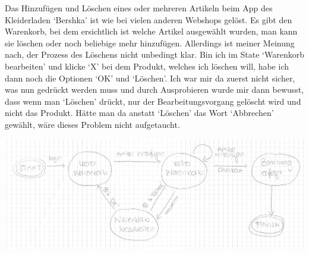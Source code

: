 Das Hinzufügen und Löschen eines oder mehreren Artikeln beim App des Kleiderladen ‘Bershka’ ist wie bei vielen anderen Webshops gelöst. 
Es gibt den Warenkorb, bei dem ersichtlich ist welche Artikel ausgewählt wurden, man kann sie löschen oder noch beliebige mehr hinzufügen. 
Allerdings ist meiner Meinung nach, der Prozess des Löschens nicht unbedingt klar. Bin ich im State ‘Warenkorb bearbeiten’ und klicke ‘X’ 
bei dem Produkt, welches ich löschen will, habe ich dann noch die Optionen ‘OK’ und ‘Löschen’. Ich war mir da zuerst nicht sicher, was nun 
gedrückt werden muss und durch Ausprobieren wurde mir dann bewusst, dass wenn man ‘Löschen’ drückt, nur der Bearbeitungsvorgang gelöscht 
wird und nicht das Produkt. Hätte man da anstatt ‘Löschen’ das Wort ‘Abbrechen’ gewählt, wäre dieses Problem nicht aufgetaucht. 

\includegraphics[scale=.5]{images/Scan4_1.jpeg}
